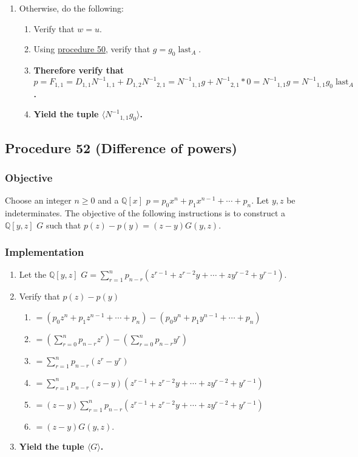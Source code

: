 \documentclass[twocolumn]{article}
\DeclareMathOperator{\last}{last}
\begin{document}
\begin{enumerate}
					\item Otherwise, do the following:
					\begin{enumerate}
						\item Verify that $w=u$.
						\item Using \hyperref[sec:procedure 50]{procedure 50}, verify that $g=g_0\last_A$.
						\item \textbf{Therefore verify that $p=F_{1,1}=D_{1,1}{N^{-1}}_{1,1}+D_{1,2}{N^{-1}}_{2,1}={N^{-1}}_{1,1}g+{N^{-1}}_{2,1}*0={N^{-1}}_{1,1}g={N^{-1}}_{1,1}g_0\last_A$.}
						\item \textbf{Yield the tuple $\langle {N^{-1}}_{1,1}g_0\rangle$.}
					\end{enumerate}
				\end{enumerate}
		\subsection{Procedure 52 (Difference of powers)}\label{sec:procedure 52}
			\subsubsection{Objective}
				Choose an integer $n\ge 0$ and a $\mathbb{Q}[x]$ $p=p_0x^n+p_1x^{n-1}+\cdots+p_n$. Let $y,z$ be indeterminates. The objective of the following instructions is to construct a $\mathbb{Q}[y,z]$ $G$ such that $p(z)-p(y)=(z-y)G(y,z)$.
			\subsubsection{Implementation}
				\begin{enumerate}
					\item Let the $\mathbb{Q}[y,z]$ $G=\sum_{r=1}^n p_{n-r}(z^{r-1}+z^{r-2}y+\cdots+zy^{r-2}+y^{r-1})$.
					\item Verify that $p(z)-p(y)$
					\begin{enumerate}
						\item $=(p_0z^n+p_1z^{n-1}+\cdots+p_n)-(p_0y^n+p_1y^{n-1}+\cdots+p_n)$
						\item $=(\sum_{r=0}^n p_{n-r}z^r)-(\sum_{r=0}^n p_{n-r}y^r)$
						\item $=\sum_{r=1}^n p_{n-r}(z^r-y^r)$
						\item $=\sum_{r=1}^n p_{n-r}(z-y)(z^{r-1}+z^{r-2}y+\cdots+zy^{r-2}+y^{r-1})$
						\item $=(z-y)\sum_{r=1}^n p_{n-r}(z^{r-1}+z^{r-2}y+\cdots+zy^{r-2}+y^{r-1})$
						\item $=(z-y)G(y,z)$.
					\end{enumerate}
					\item \textbf{Yield the tuple $\langle G\rangle$.}
				\end{enumerate}
\end{document}
